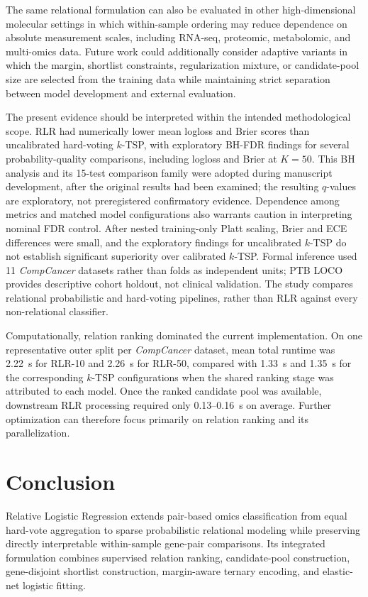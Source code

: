 \documentclass[preprint,12pt,a4paper]{elsarticle}
\begin{document}
The same relational formulation can also be evaluated in other high-dimensional molecular settings in which within-sample ordering may reduce dependence on absolute measurement scales, including RNA-seq, proteomic, metabolomic, and multi-omics data. Future work could additionally consider adaptive variants in which the margin, shortlist constraints, regularization mixture, or candidate-pool size are selected from the training data while maintaining strict separation between model development and external evaluation.

The present evidence should be interpreted within the intended methodological scope. RLR had numerically lower mean logloss and Brier scores than uncalibrated hard-voting $k$-TSP, with exploratory BH-FDR findings for several probability-quality comparisons, including logloss and Brier at $K=50$. This BH analysis and its 15-test comparison family were adopted during manuscript development, after the original results had been examined; the resulting $q$-values are exploratory, not preregistered confirmatory evidence. Dependence among metrics and matched model configurations also warrants caution in interpreting nominal FDR control. After nested training-only Platt scaling, Brier and ECE differences were small, and the exploratory findings for uncalibrated $k$-TSP do not establish significant superiority over calibrated $k$-TSP. Formal inference used 11 \emph{CompCancer} datasets rather than folds as independent units; PTB LOCO provides descriptive cohort holdout, not clinical validation. The study compares relational probabilistic and hard-voting pipelines, rather than RLR against every non-relational classifier.

Computationally, relation ranking dominated the current implementation. On one representative outer split per \emph{CompCancer} dataset, mean total runtime was 2.22~s for RLR-10 and 2.26~s for RLR-50, compared with 1.33~s and 1.35~s for the corresponding $k$-TSP configurations when the shared ranking stage was attributed to each model. Once the ranked candidate pool was available, downstream RLR processing required only 0.13--0.16~s on average. Further optimization can therefore focus primarily on relation ranking and its parallelization.

\section{Conclusion}\label{sec:conclusion}

Relative Logistic Regression extends pair-based omics classification from equal hard-vote aggregation to sparse probabilistic relational modeling while preserving directly interpretable within-sample gene-pair comparisons. Its integrated formulation combines supervised relation ranking, candidate-pool construction, gene-disjoint shortlist construction, margin-aware ternary encoding, and elastic-net logistic fitting.
\end{document}
